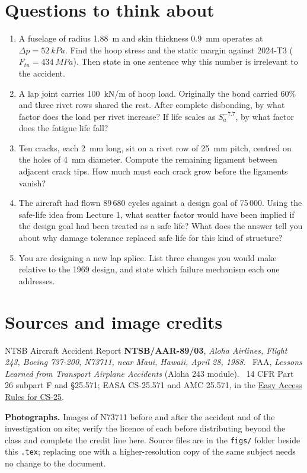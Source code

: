 \documentclass[11pt,a4paper]{article}
\begin{document}
\section{Questions to think about}

\begin{enumerate}[nosep]
  \item A fuselage of radius \SI{1.88}{m} and skin thickness \SI{0.9}{mm} operates at $\Delta p=\SI{52}{kPa}$. Find the hoop stress and the static margin against 2024-T3 ($F_{tu}=\SI{434}{MPa}$). Then state in one sentence why this number is irrelevant to the accident.
  \item A lap joint carries \SI{100}{kN/m} of hoop load. Originally the bond carried 60\% and three rivet rows shared the rest. After complete disbonding, by what factor does the load per rivet increase? If life scales as $S_a^{-7.7}$, by what factor does the fatigue life fall?
  \item Ten cracks, each \SI{2}{mm} long, sit on a rivet row of \SI{25}{mm} pitch, centred on the holes of \SI{4}{mm} diameter. Compute the remaining ligament between adjacent crack tips. How much must each crack grow before the ligaments vanish?
  \item The aircraft had flown 89\,680 cycles against a design goal of 75\,000. Using the safe-life idea from Lecture 1, what scatter factor would have been implied if the design goal had been treated as a safe life? What does the answer tell you about why damage tolerance replaced safe life for this kind of structure?
  \item You are designing a new lap splice. List three changes you would make relative to the 1969 design, and state which failure mechanism each one addresses.
\end{enumerate}

\section*{Sources and image credits}
\footnotesize
NTSB Aircraft Accident Report \textbf{NTSB/AAR-89/03}, \emph{Aloha Airlines, Flight 243, Boeing 737-200, N73711, near Maui, Hawaii, April 28, 1988}. \ FAA, \emph{Lessons Learned from Transport Airplane Accidents} (Aloha 243 module). \ 14 CFR Part 26 subpart F and \S25.571; EASA CS-25.571 and AMC 25.571, in the \href{https://www.easa.europa.eu/en/document-library/easy-access-rules/online-publications/easy-access-rules-large-aeroplanes-cs-25}{Easy Access Rules for CS-25}.

\medskip
\textbf{Photographs.} Images of N73711 before and after the accident and of the investigation on site; verify the licence of each before distributing beyond the class and complete the credit line here. Source files are in the \texttt{figs/} folder beside this \texttt{.tex}; replacing one with a higher-resolution copy of the same subject needs no change to the document.
\end{document}
